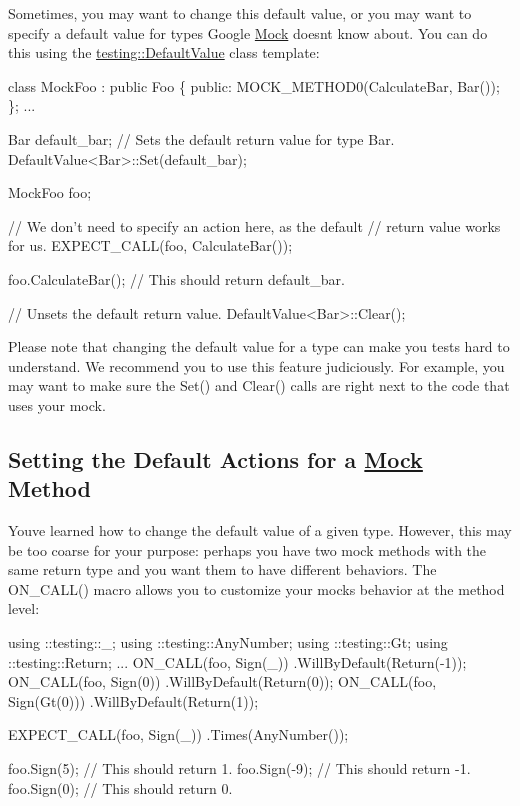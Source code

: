 Sometimes, you may want to change this default value, or you may want to specify a default value for types Google \hyperlink{class_mock}{Mock} doesn\textquotesingle{}t know about. You can do this using the {\ttfamily \hyperlink{classtesting_1_1_default_value}{testing\+::\+Default\+Value}} class template\+:


\begin{DoxyCode}
class MockFoo : public Foo \{
 public:
  MOCK\_METHOD0(CalculateBar, Bar());
\};
...

  Bar default\_bar;
  // Sets the default return value for type Bar.
  DefaultValue<Bar>::Set(default\_bar);

  MockFoo foo;

  // We don't need to specify an action here, as the default
  // return value works for us.
  EXPECT\_CALL(foo, CalculateBar());

  foo.CalculateBar();  // This should return default\_bar.

  // Unsets the default return value.
  DefaultValue<Bar>::Clear();
\end{DoxyCode}


Please note that changing the default value for a type can make you tests hard to understand. We recommend you to use this feature judiciously. For example, you may want to make sure the {\ttfamily Set()} and {\ttfamily Clear()} calls are right next to the code that uses your mock.

\subsection*{Setting the Default Actions for a \hyperlink{class_mock}{Mock} Method}

You\textquotesingle{}ve learned how to change the default value of a given type. However, this may be too coarse for your purpose\+: perhaps you have two mock methods with the same return type and you want them to have different behaviors. The {\ttfamily O\+N\+\_\+\+C\+A\+L\+L()} macro allows you to customize your mock\textquotesingle{}s behavior at the method level\+:


\begin{DoxyCode}
using ::testing::\_;
using ::testing::AnyNumber;
using ::testing::Gt;
using ::testing::Return;
...
  ON\_CALL(foo, Sign(\_))
      .WillByDefault(Return(-1));
  ON\_CALL(foo, Sign(0))
      .WillByDefault(Return(0));
  ON\_CALL(foo, Sign(Gt(0)))
      .WillByDefault(Return(1));

  EXPECT\_CALL(foo, Sign(\_))
      .Times(AnyNumber());

  foo.Sign(5);   // This should return 1.
  foo.Sign(-9);  // This should return -1.
  foo.Sign(0);   // This should return 0.
\end{DoxyCode}


